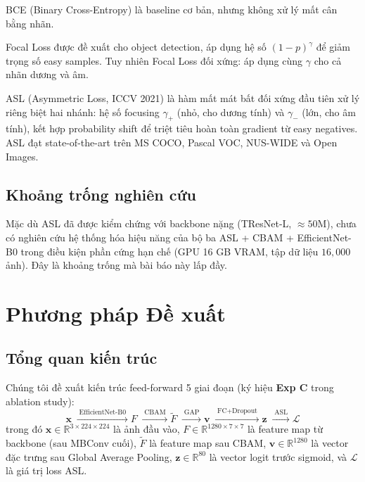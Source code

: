 \documentclass[conference]{IEEEtran}
\begin{document}
BCE (Binary Cross-Entropy) \cite{goodfellow2016deep} là baseline cơ bản,
nhưng không xử lý mất cân bằng nhãn.

Focal Loss \cite{lin2017focal} được đề xuất cho object detection,
áp dụng hệ số $(1-p)^\gamma$ để giảm trọng số easy samples.
Tuy nhiên Focal Loss đối xứng: áp dụng cùng $\gamma$ cho cả nhãn dương và âm.

ASL \cite{ridnik2021asl} (Asymmetric Loss, ICCV 2021) là hàm mất mát
bất đối xứng đầu tiên xử lý riêng biệt hai nhánh:
hệ số focusing $\gamma_+$ (nhỏ, cho dương tính) và $\gamma_-$ (lớn, cho âm tính),
kết hợp probability shift để triệt tiêu hoàn toàn gradient từ easy negatives.
ASL đạt state-of-the-art trên MS COCO, Pascal VOC, NUS-WIDE và Open Images.

\subsection{Khoảng trống nghiên cứu}

Mặc dù ASL đã được kiểm chứng với backbone nặng (TResNet-L, $\approx 50\text{M}$),
chưa có nghiên cứu hệ thống hóa hiệu năng của bộ ba ASL + CBAM + EfficientNet-B0
trong điều kiện phần cứng hạn chế (GPU 16 GB VRAM, tập dữ liệu $16{,}000$ ảnh).
Đây là khoảng trống mà bài báo này lấp đầy.

\section{Phương pháp Đề xuất}
\label{sec:method}

\subsection{Tổng quan kiến trúc}

Chúng tôi đề xuất kiến trúc feed-forward 5 giai đoạn
(ký hiệu \textbf{Exp C} trong ablation study):
\begin{equation}
  \mathbf{x}
  \;\xrightarrow{\;\text{EfficientNet-B0}\;}
  F
  \;\xrightarrow{\;\text{CBAM}\;}
  \tilde{F}
  \;\xrightarrow{\;\text{GAP}\;}
  \mathbf{v}
  \;\xrightarrow{\;\text{FC+Dropout}\;}
  \mathbf{z}
  \;\xrightarrow{\;\text{ASL}\;}
  \mathcal{L}
  \label{eq:pipeline}
\end{equation}
trong đó $\mathbf{x} \in \mathbb{R}^{3 \times 224 \times 224}$ là ảnh đầu vào,
$F \in \mathbb{R}^{1280 \times 7 \times 7}$ là feature map từ backbone (sau MBConv cuối),
$\tilde{F}$ là feature map sau CBAM,
$\mathbf{v} \in \mathbb{R}^{1280}$ là vector đặc trưng sau Global Average Pooling,
$\mathbf{z} \in \mathbb{R}^{80}$ là vector logit trước sigmoid,
và $\mathcal{L}$ là giá trị loss ASL.
\end{document}
